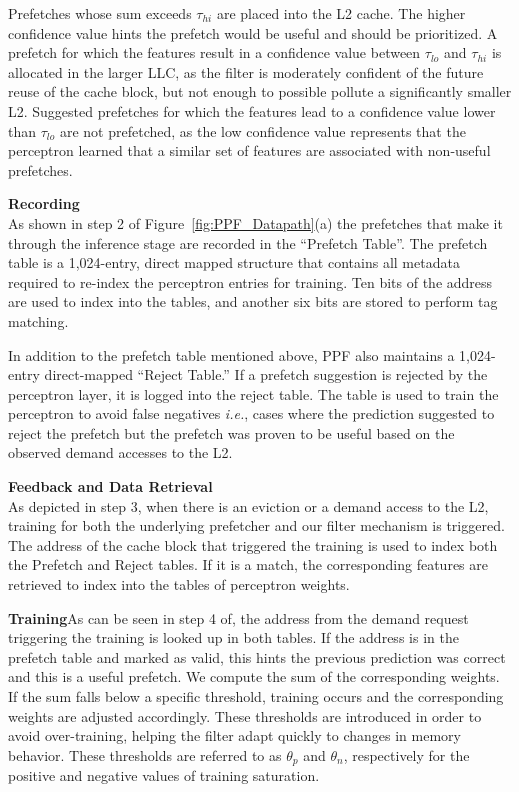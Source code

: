 Prefetches whose sum exceeds $\tau_{hi}$ are placed into the L2 cache.
The higher confidence value hints the prefetch would be useful and
should be prioritized.  A prefetch for which the features result in a
confidence value between $\tau_{lo}$ and $\tau_{hi}$ is allocated in
the larger LLC, as the filter is moderately confident of the future
reuse of the cache block, but not enough to possible pollute a
significantly smaller L2.  Suggested prefetches for which the features
lead to a confidence value lower than $\tau_{lo}$ are not prefetched,
as the low confidence value represents that the perceptron learned
that a similar set of features are associated with non-useful
prefetches.

\noindent \textbf{Recording}\\
As shown in step 2 of Figure~\ref{fig:PPF_Datapath}(a) the prefetches
that make it through the inference stage are recorded in the
``Prefetch Table''. The prefetch table is a 1,024-entry, direct mapped
structure that contains all metadata required to re-index the
perceptron entries for training. {\color{red}Ten bits of the address are 
used to index into the tables, and another six bits are stored to 
perform tag matching.} 

In addition to the prefetch table mentioned above, PPF also maintains
a 1,024-entry direct-mapped ``Reject Table.'' If a prefetch suggestion
is rejected by the perceptron layer, it is logged into the reject
table. The table is used to train the perceptron to avoid false
negatives \textit{i.e.}, cases where the prediction suggested to
reject the prefetch but the prefetch was proven to be useful based on
the observed demand accesses to the L2.

\noindent \textbf{Feedback and Data Retrieval}\\
As depicted in step 3, when there is an eviction or a demand access 
to the L2, training for both the {\color{red}underlying} prefetcher 
and our filter mechanism is triggered. The address of the cache block 
that triggered the training is used to index both the Prefetch and 
Reject tables. {\color{red}If it is a match, the corresponding
features are retrieved to index into the tables of perceptron weights.}


\noindent \textbf{Training}\newline As can be seen in step 4 of, 
the address from the demand
request triggering the training is looked up in both tables. If the
address is in the prefetch table and marked as valid, this hints the
previous prediction was correct and this is a useful prefetch. We
compute the sum of the corresponding weights. If the sum falls below a
specific threshold, training occurs and the corresponding weights are
adjusted accordingly. These thresholds are introduced in order to
avoid over-training, helping the filter adapt quickly to changes in
memory behavior. These thresholds are referred to as $\theta_p$ and
$\theta_n$, respectively for the positive and negative values of
training saturation.

